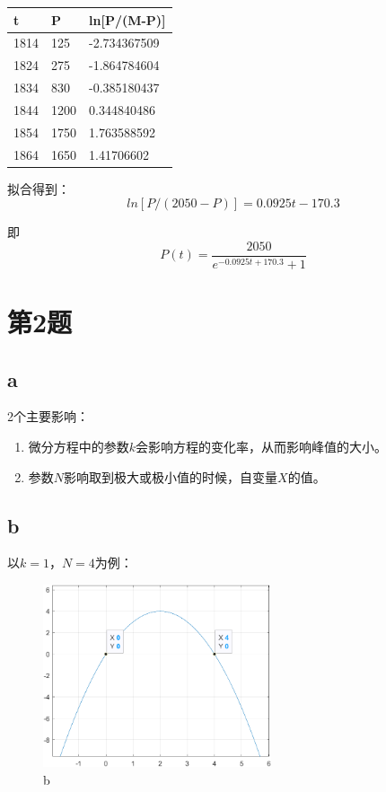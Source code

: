 \documentclass{article}
\begin{document}
\begin{table}[!ht]
    \centering
    \begin{tabular}{|l|l|l|}
    \hline
        t & P & ln[P/(M-P)] \\ \hline
        1814 & 125 & -2.734367509 \\ \hline
        1824 & 275 & -1.864784604 \\ \hline
        1834 & 830 & -0.385180437 \\ \hline
        1844 & 1200 & 0.344840486 \\ \hline
        1854 & 1750 & 1.763588592 \\ \hline
        1864 & 1650 & 1.41706602 \\ \hline
    \end{tabular}
\end{table}

拟合得到：
\[ln\left[P/(2050-P)\right] = 0.0925t - 170.3\]

即
\[P(t) = \frac{2050}{e^{-0.0925t+170.3}+1}\]


\section{第2题}
\subsection{a}
2个主要影响：
\begin{enumerate}
    \item 微分方程中的参数$k$会影响方程的变化率，从而影响峰值的大小。
    \item 参数$N$影响取到极大或极小值的时候，自变量$X$的值。
\end{enumerate}

\subsection{b}
以$k = 1$，$N = 4$为例：
\begin{figure}[!h]
    \centering
    \includegraphics[width=0.6\textwidth]{pic/hw10_02.png}
    \caption{b}
\end{figure}
\end{document}
